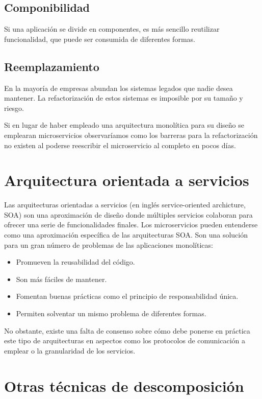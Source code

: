 \documentclass[11pt,a4paper]{article}
\begin{document}
\subsection{Componibilidad}
Si una aplicación se divide en componentes, es más sencillo reutilizar funcionalidad, que puede ser consumida de diferentes formas.

\subsection{Reemplazamiento}
En la mayoría de empresas abundan los sistemas legados que nadie desea mantener. La refactorización de estos sistemas es imposible por su tamaño y riesgo. 

Si en lugar de haber empleado una arquitectura monolítica para su diseño se emplearan microservicios observaríamos como los barreras para la refactorización no existen al poderse reescribir el microservicio al completo en pocos días.

\section{Arquitectura orientada a servicios}
Las arquitecturas orientadas a servicios (en inglés service-oriented archicture, SOA)  son una aproximación de diseño donde múltiples servicios colaboran para ofrecer una serie de funcionalidades finales. Los microservicios pueden entenderse como una aproximación específica de las arquitecturas SOA. Son una solución para un gran número de problemas de las aplicaciones monolíticas:
\begin{itemize}
\item Promueven la reusabilidad del código.
\item Son más fáciles de mantener.
\item Fomentan buenas prácticas como el principio de responsabilidad única.
\item Permiten solventar un mismo problema de diferentes formas. 
\end{itemize}

No obstante, existe una falta de consenso sobre cómo debe ponerse en práctica este tipo de arquitecturas en aspectos como los protocolos de comunicación a emplear o la granularidad de los servicios.

\section{Otras técnicas de descomposición}
\end{document}
